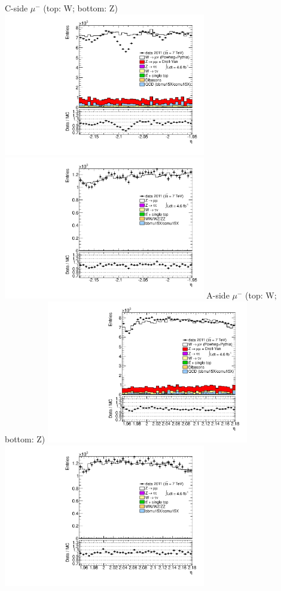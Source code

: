  {
\colb[T]
C-side $\mu^{-}$ (top: W; bottom: Z)
\centering
\includegraphics[width=0.66\textwidth]{dates/20130306/figures/both/W_10_C_stack_l_eta_NEG} \\
\includegraphics[width=0.66\textwidth]{dates/20130306/figures/both/Ztprobet_10_C_stack_lN_eta_ALL.pdf}
A-side $\mu^{-}$ (top: W; bottom: Z)
\centering
\includegraphics[width=0.66\textwidth]{dates/20130306/figures/both/W_10_A_stack_l_eta_NEG} \\
\includegraphics[width=0.66\textwidth]{dates/20130306/figures/both/Ztprobet_10_A_stack_lN_eta_ALL.pdf} 
\cole
}

